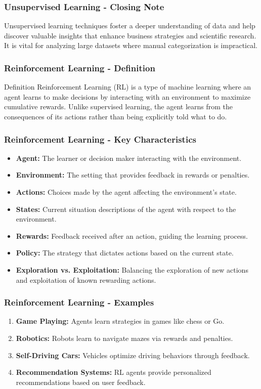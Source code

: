 \documentclass[aspectratio=169]{beamer}
\begin{document}
\begin{frame}[fragile]
    \frametitle{Unsupervised Learning - Closing Note}
    Unsupervised learning techniques foster a deeper understanding of data and help discover valuable insights that enhance business strategies and scientific research. It is vital for analyzing large datasets where manual categorization is impractical.
\end{frame}

\begin{frame}[fragile]
    \frametitle{Reinforcement Learning - Definition}
    \begin{block}{Definition}
        Reinforcement Learning (RL) is a type of machine learning where an agent learns to make decisions by interacting with an environment to maximize cumulative rewards. Unlike supervised learning, the agent learns from the consequences of its actions rather than being explicitly told what to do.
    \end{block}
\end{frame}

\begin{frame}[fragile]
    \frametitle{Reinforcement Learning - Key Characteristics}
    \begin{itemize}
        \item \textbf{Agent:} The learner or decision maker interacting with the environment.
        \item \textbf{Environment:} The setting that provides feedback in rewards or penalties.
        \item \textbf{Actions:} Choices made by the agent affecting the environment's state.
        \item \textbf{States:} Current situation descriptions of the agent with respect to the environment.
        \item \textbf{Rewards:} Feedback received after an action, guiding the learning process.
        \item \textbf{Policy:} The strategy that dictates actions based on the current state.
        \item \textbf{Exploration vs. Exploitation:} Balancing the exploration of new actions and exploitation of known rewarding actions.
    \end{itemize}
\end{frame}

\begin{frame}[fragile]
    \frametitle{Reinforcement Learning - Examples}
    \begin{enumerate}
        \item \textbf{Game Playing:} Agents learn strategies in games like chess or Go.
        \item \textbf{Robotics:} Robots learn to navigate mazes via rewards and penalties.
        \item \textbf{Self-Driving Cars:} Vehicles optimize driving behaviors through feedback.
        \item \textbf{Recommendation Systems:} RL agents provide personalized recommendations based on user feedback.
    \end{enumerate}
\end{frame}
\end{document}

